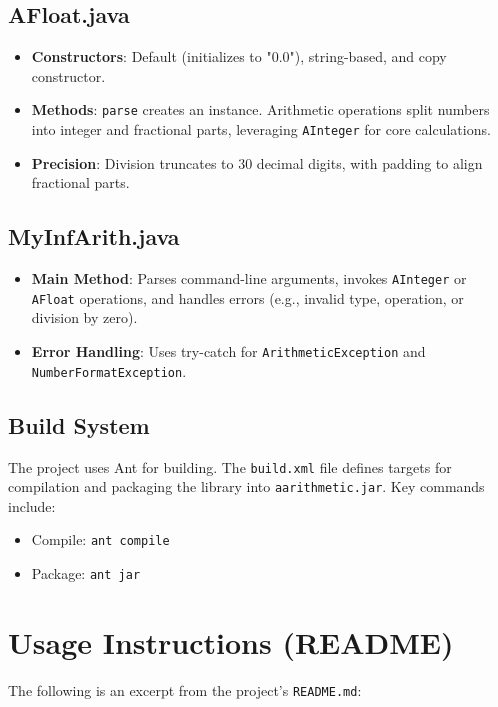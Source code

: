 \documentclass[12pt]{article}
\begin{document}
\subsection{AFloat.java}
\begin{itemize}
    \item \textbf{Constructors}: Default (initializes to "0.0"), string-based, and copy constructor.
    \item \textbf{Methods}: \texttt{parse} creates an instance. Arithmetic operations split numbers into integer and fractional parts, leveraging \texttt{AInteger} for core calculations.
    \item \textbf{Precision}: Division truncates to 30 decimal digits, with padding to align fractional parts.
\end{itemize}

\subsection{MyInfArith.java}
\begin{itemize}
    \item \textbf{Main Method}: Parses command-line arguments, invokes \texttt{AInteger} or \texttt{AFloat} operations, and handles errors (e.g., invalid type, operation, or division by zero).
    \item \textbf{Error Handling}: Uses try-catch for \texttt{ArithmeticException} and \texttt{NumberFormatException}.
\end{itemize}

\subsection{Build System}
The project uses Ant for building. The \texttt{build.xml} file defines targets for compilation and packaging the library into \texttt{aarithmetic.jar}. Key commands include:
\begin{itemize}
    \item Compile: \texttt{ant compile}
    \item Package: \texttt{ant jar}
\end{itemize}

\section{Usage Instructions (README)}
The following is an excerpt from the project's \texttt{README.md}:
\end{document}
